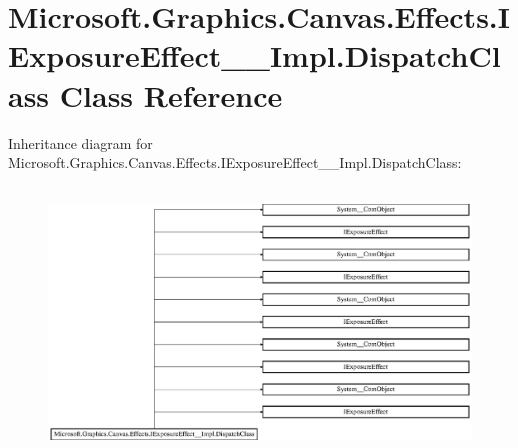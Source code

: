\hypertarget{class_microsoft_1_1_graphics_1_1_canvas_1_1_effects_1_1_i_exposure_effect_____impl_1_1_dispatch_class}{}\section{Microsoft.\+Graphics.\+Canvas.\+Effects.\+I\+Exposure\+Effect\+\_\+\+\_\+\+Impl.\+Dispatch\+Class Class Reference}
\label{class_microsoft_1_1_graphics_1_1_canvas_1_1_effects_1_1_i_exposure_effect_____impl_1_1_dispatch_class}
Inheritance diagram for Microsoft.\+Graphics.\+Canvas.\+Effects.\+I\+Exposure\+Effect\+\_\+\+\_\+\+Impl.\+Dispatch\+Class\+:\begin{figure}[H]
\begin{center}
\leavevmode
\includegraphics[height=7.146172cm]{class_microsoft_1_1_graphics_1_1_canvas_1_1_effects_1_1_i_exposure_effect_____impl_1_1_dispatch_class}
\end{center}
\end{figure}
